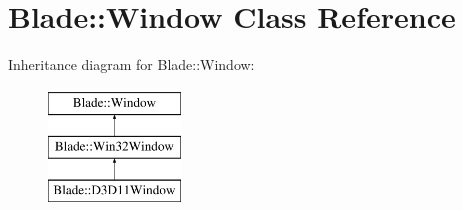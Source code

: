 \hypertarget{class_blade_1_1_window}{}\section{Blade\+:\+:Window Class Reference}
\label{class_blade_1_1_window}
Inheritance diagram for Blade\+:\+:Window\+:\begin{figure}[H]
\begin{center}
\leavevmode
\includegraphics[height=3.000000cm]{class_blade_1_1_window}
\end{center}
\end{figure}
